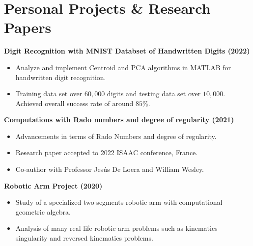 \section{\sc Personal Projects \& Research Papers}

{\bf{Digit Recognition with MNIST Databset of Handwritten Digits} (2022)}\\
\begin{itemize}
\setlength\itemsep{0em}
\item Analyze and implement Centroid and PCA algorithms in MATLAB for handwritten digit recognition. 
\item Training data set over $60,000$ digits and testing data set over $10,000$. Achieved overall success rate of around $85\%$.
\end{itemize}

{\bf{Computations with Rado numbers and degree of regularity} (2021)}\\
\begin{itemize}
\setlength\itemsep{0em}
\item Advancements in terms of Rado Numbers and degree of regularity.
\item Research paper accepted to 2022 ISAAC conference, France.
\item Co-author with Professor Jes\'{u}s De Loera and William Wesley.
\end{itemize}


{\bf{Robotic Arm Project} (2020)}\\
\begin{itemize}
\setlength\itemsep{0em}
\item Study of a specialized two segments robotic arm with computational geometric algebra.
\item Analysis of many real life robotic arm problems such as kinematics singularity and reversed kinematics problems. 
\end{itemize}


